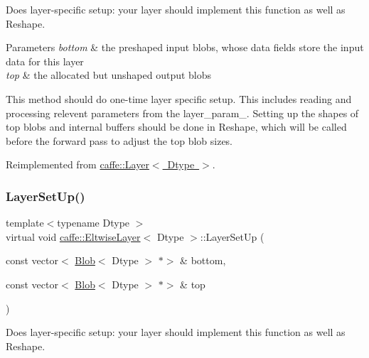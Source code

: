 Does layer-\/specific setup\+: your layer should implement this function as well as Reshape. 


\begin{DoxyParams}{Parameters}
{\em bottom} & the preshaped input blobs, whose data fields store the input data for this layer \\
\hline
{\em top} & the allocated but unshaped output blobs\\
\hline
\end{DoxyParams}
This method should do one-\/time layer specific setup. This includes reading and processing relevent parameters from the {\ttfamily layer\+\_\+param\+\_\+}. Setting up the shapes of top blobs and internal buffers should be done in {\ttfamily Reshape}, which will be called before the forward pass to adjust the top blob sizes. 

Reimplemented from \mbox{\hyperlink{classcaffe_1_1_layer_a481323a3e0972c682787f2137468c29f}{caffe\+::\+Layer$<$ Dtype $>$}}.

\mbox{\label{classcaffe_1_1_eltwise_layer_a31bdf9cf9a45105610a85cd82a96e0bf}} 
\subsubsection{\texorpdfstring{Layer\+Set\+Up()}{LayerSetUp()}\hspace{0.1cm}{\footnotesize\ttfamily [2/2]}}
{\footnotesize\ttfamily template$<$typename Dtype $>$ \\
virtual void \mbox{\hyperlink{classcaffe_1_1_eltwise_layer}{caffe\+::\+Eltwise\+Layer}}$<$ Dtype $>$\+::Layer\+Set\+Up (\begin{DoxyParamCaption}\item[{const vector$<$ \mbox{\hyperlink{classcaffe_1_1_blob}{Blob}}$<$ Dtype $>$ $\ast$$>$ \&}]{bottom,  }\item[{const vector$<$ \mbox{\hyperlink{classcaffe_1_1_blob}{Blob}}$<$ Dtype $>$ $\ast$$>$ \&}]{top }\end{DoxyParamCaption})\hspace{0.3cm}{\ttfamily [virtual]}}



Does layer-\/specific setup\+: your layer should implement this function as well as Reshape. 


